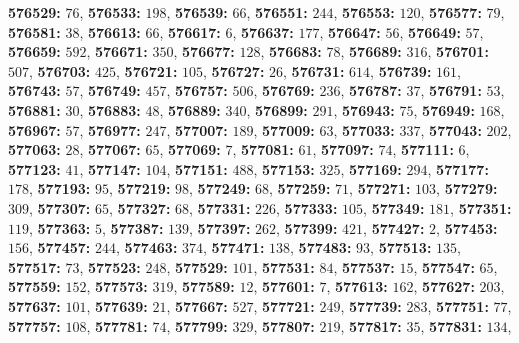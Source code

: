 \textsf{\bfseries 576529:} $76$, \textsf{\bfseries 576533:} $198$, \textsf{\bfseries 576539:} $66$, \textsf{\bfseries 576551:} $244$, \textsf{\bfseries 576553:} $120$, \textsf{\bfseries 576577:} $79$, \textsf{\bfseries 576581:} $38$, \textsf{\bfseries 576613:} $66$, \textsf{\bfseries 576617:} $6$, \textsf{\bfseries 576637:} $177$, \textsf{\bfseries 576647:} $56$, \textsf{\bfseries 576649:} $57$, \textsf{\bfseries 576659:} $592$, \textsf{\bfseries 576671:} $350$, \textsf{\bfseries 576677:} $128$, \textsf{\bfseries 576683:} $78$, \textsf{\bfseries 576689:} $316$, \textsf{\bfseries 576701:} $507$, \textsf{\bfseries 576703:} $425$, \textsf{\bfseries 576721:} $105$, \textsf{\bfseries 576727:} $26$, \textsf{\bfseries 576731:} $614$, \textsf{\bfseries 576739:} $161$, \textsf{\bfseries 576743:} $57$, \textsf{\bfseries 576749:} $457$, \textsf{\bfseries 576757:} $506$, \textsf{\bfseries 576769:} $236$, \textsf{\bfseries 576787:} $37$, \textsf{\bfseries 576791:} $53$, \textsf{\bfseries 576881:} $30$, \textsf{\bfseries 576883:} $48$, \textsf{\bfseries 576889:} $340$, \textsf{\bfseries 576899:} $291$, \textsf{\bfseries 576943:} $75$, \textsf{\bfseries 576949:} $168$, \textsf{\bfseries 576967:} $57$, \textsf{\bfseries 576977:} $247$, \textsf{\bfseries 577007:} $189$, \textsf{\bfseries 577009:} $63$, \textsf{\bfseries 577033:} $337$, \textsf{\bfseries 577043:} $202$, \textsf{\bfseries 577063:} $28$, \textsf{\bfseries 577067:} $65$, \textsf{\bfseries 577069:} $7$, \textsf{\bfseries 577081:} $61$, \textsf{\bfseries 577097:} $74$, \textsf{\bfseries 577111:} $6$, \textsf{\bfseries 577123:} $41$, \textsf{\bfseries 577147:} $104$, \textsf{\bfseries 577151:} $488$, \textsf{\bfseries 577153:} $325$, \textsf{\bfseries 577169:} $294$, \textsf{\bfseries 577177:} $178$, \textsf{\bfseries 577193:} $95$, \textsf{\bfseries 577219:} $98$, \textsf{\bfseries 577249:} $68$, \textsf{\bfseries 577259:} $71$, \textsf{\bfseries 577271:} $103$, \textsf{\bfseries 577279:} $309$, \textsf{\bfseries 577307:} $65$, \textsf{\bfseries 577327:} $68$, \textsf{\bfseries 577331:} $226$, \textsf{\bfseries 577333:} $105$, \textsf{\bfseries 577349:} $181$, \textsf{\bfseries 577351:} $119$, \textsf{\bfseries 577363:} $5$, \textsf{\bfseries 577387:} $139$, \textsf{\bfseries 577397:} $262$, \textsf{\bfseries 577399:} $421$, \textsf{\bfseries 577427:} $2$, \textsf{\bfseries 577453:} $156$, \textsf{\bfseries 577457:} $244$, \textsf{\bfseries 577463:} $374$, \textsf{\bfseries 577471:} $138$, \textsf{\bfseries 577483:} $93$, \textsf{\bfseries 577513:} $135$, \textsf{\bfseries 577517:} $73$, \textsf{\bfseries 577523:} $248$, \textsf{\bfseries 577529:} $101$, \textsf{\bfseries 577531:} $84$, \textsf{\bfseries 577537:} $15$, \textsf{\bfseries 577547:} $65$, \textsf{\bfseries 577559:} $152$, \textsf{\bfseries 577573:} $319$, \textsf{\bfseries 577589:} $12$, \textsf{\bfseries 577601:} $7$, \textsf{\bfseries 577613:} $162$, \textsf{\bfseries 577627:} $203$, \textsf{\bfseries 577637:} $101$, \textsf{\bfseries 577639:} $21$, \textsf{\bfseries 577667:} $527$, \textsf{\bfseries 577721:} $249$, \textsf{\bfseries 577739:} $283$, \textsf{\bfseries 577751:} $77$, \textsf{\bfseries 577757:} $108$, \textsf{\bfseries 577781:} $74$, \textsf{\bfseries 577799:} $329$, \textsf{\bfseries 577807:} $219$, \textsf{\bfseries 577817:} $35$, \textsf{\bfseries 577831:} $134$, 
